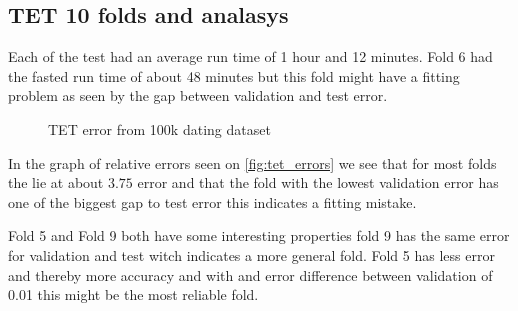 \subsection{TET 10 folds and analasys}
Each of the test had an average run time of 1 hour and 12 minutes.  Fold 6 had the fasted run time of about 48 minutes but this fold might have a fitting problem as seen by the gap between validation and test error.

\begin{figure}[H]
	\centering
	\begin{adjustbox}{width=0.5\textwidth}
		
	\end{adjustbox}
	\caption{TET error from 100k dating dataset }
	\label{fig:tet_errors}
\end{figure}

In the graph of relative errors seen on \autoref{fig:tet_errors} we see that for most folds the lie at about $3.75$ error and that the fold with the lowest validation error has one of the biggest gap to test error this indicates a fitting mistake. 

Fold 5 and Fold 9 both have some interesting properties fold 9 has the same error for validation and test witch indicates a more general fold. Fold 5 has less error and thereby more accuracy and with and error difference between validation of 0.01 this might be the most reliable fold.
